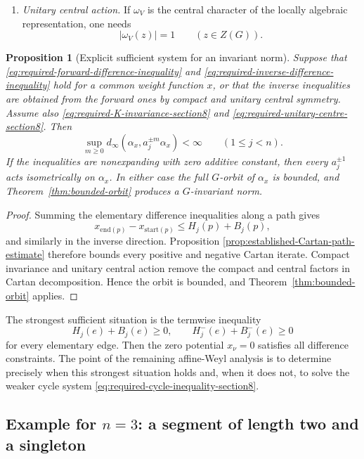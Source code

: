 \documentclass[12pt]{article}
\newtheorem{proposition}[theorem]{Proposition}
\theoremstyle{definition}
\theoremstyle{remark}
\begin{document}
\begin{enumerate}
 \item \emph{Unitary central action.}
 If \(\omega_V\) is the central character of the locally algebraic
 representation, one needs
 \begin{equation}\label{eq:required-unitary-centre-section8}
  |\omega_V(z)|=1
  \qquad(z\in Z(G)).
 \end{equation}
\end{enumerate}

\begin{proposition}[Explicit sufficient system for an invariant norm]
\label{prop:explicit-sufficient-system-invariant-norm}
Suppose that
\eqref{eq:required-forward-difference-inequality} and
\eqref{eq:required-inverse-difference-inequality} hold for a common weight
function \(x\), or that the inverse inequalities are obtained from the
forward ones by compact and unitary central symmetry.  Assume also
\eqref{eq:required-K-invariance-section8} and
\eqref{eq:required-unitary-centre-section8}.  Then
\[
 \sup_{m\geq0}d_\infty(\alpha_x,a_j^{\pm m}\alpha_x)<\infty
 \qquad(1\leq j<n).
\]
If the inequalities are nonexpanding with zero additive constant, then every
\(a_j^{\pm1}\) acts isometrically on \(\alpha_x\).  In either case the full
\(G\)-orbit of \(\alpha_x\) is bounded, and Theorem~\ref{thm:bounded-orbit}
produces a \(G\)-invariant norm.
\end{proposition}

\begin{proof}
Summing the elementary difference inequalities along a path gives
\[
 x_{\mathrm{end}(p)}-x_{\mathrm{start}(p)}
 \leq H_j(p)+B_j(p),
\]
and similarly in the inverse direction.  Proposition
\ref{prop:established-Cartan-path-estimate} therefore bounds every positive
and negative Cartan iterate.  Compact invariance and unitary central action
remove the compact and central factors in Cartan decomposition.  Hence the
orbit is bounded, and Theorem~\ref{thm:bounded-orbit} applies.
\end{proof}

The strongest sufficient situation is the termwise inequality
\[
 H_j(e)+B_j(e)\geq0,
 \qquad
 H_j^-(e)+B_j^-(e)\geq0
\]
for every elementary edge.  Then the zero potential \(x_\nu=0\) satisfies
all difference constraints.  The point of the remaining affine-Weyl
analysis is to determine precisely when this strongest situation holds and,
when it does not, to solve the weaker cycle system
\eqref{eq:required-cycle-inequality-section8}.

\subsection{Example for \texorpdfstring{$n=3$}{n=3}: a segment of length two and a singleton}
\end{document}
